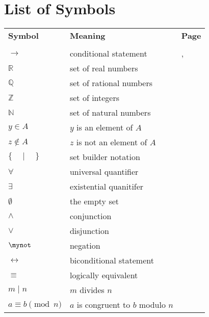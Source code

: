 \chapter{List of Symbols} \label{C:symbols210}

\begin{tabular}{p{1in} p{2.5in} l}
\textbf{Symbol}              &  \textbf{Meaning}  &  \textbf{Page} \\
        &           &       \\ 
$\to$               &   conditional statement   &  \pageref{sym:cond}, \pageref{sym:cond2}  \\
$\mathbb{R}$        &  set of real numbers      &  \pageref{sym:reals}  \\
$\mathbb{Q}$        &  set of rational numbers  &  \pageref{sym:rationals} \\
$\mathbb{Z}$        &  set of integers          &  \pageref{sym:integers}  \\
$\mathbb{N}$        &  set of natural numbers   &  \pageref{sym:naturals}  \\
$y \in A$           &  $y$ is an element of $A$ &  \pageref{sym:elementof} \\
$z \notin A$        &  $z$ is not an element of $A$ & \pageref{sym:notelement} \\
$\{ \quad \mid \quad \}$  &  set builder notation   &  \pageref{sym:setbuilder} \\
$\forall$          &  universal quantifier  &  \pageref{sym:forall} \\
$\exists$          &  existential quanitifer  &  \pageref{sym:exist} \\
$\emptyset$        &  the empty set  &  \pageref{sym:empty} \\
$\wedge$           &  conjunction  &  \pageref{sym:and} \\
$\vee$             &  disjunction  &  \pageref{sym:or} \\
$\mynot$           &  negation                      &  \pageref{sym:not} \\
$\leftrightarrow$  &  biconditional statement       &  \pageref{sym:bicond}  \\
$\equiv$           &  logically equivalent          &  \pageref{sym:logequiv}  \\
$m \mid n$	       &  $m$ divides $n$                       &  \pageref{sym:divides} \\
$a \equiv b \pmod n$   &  $a$ is congruent to $b$ modulo $n$  &  \pageref{sym:congruence} \\

\end{tabular}
